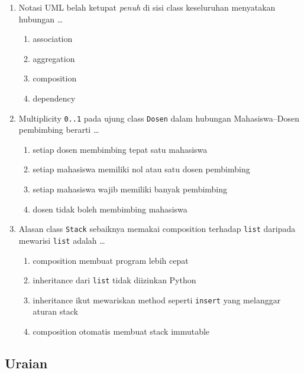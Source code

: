 \begin{enumerate}
  \item Notasi UML belah ketupat \emph{penuh} di sisi class keseluruhan menyatakan hubungan \ldots
  \begin{enumerate}[label=\alph*.,itemsep=0pt]
    \item association
    \item aggregation
    \item composition
    \item dependency
  \end{enumerate}

  \item Multiplicity \texttt{0..1} pada ujung class \texttt{Dosen} dalam hubungan Mahasiswa--Dosen pembimbing berarti \ldots
  \begin{enumerate}[label=\alph*.,itemsep=0pt]
    \item setiap dosen membimbing tepat satu mahasiswa
    \item setiap mahasiswa memiliki nol atau satu dosen pembimbing
    \item setiap mahasiswa wajib memiliki banyak pembimbing
    \item dosen tidak boleh membimbing mahasiswa
  \end{enumerate}

  \item Alasan class \texttt{Stack} sebaiknya memakai composition terhadap \texttt{list} daripada mewarisi \texttt{list} adalah \ldots
  \begin{enumerate}[label=\alph*.,itemsep=0pt]
    \item composition membuat program lebih cepat
    \item inheritance dari \texttt{list} tidak diizinkan Python
    \item inheritance ikut mewariskan method seperti \texttt{insert} yang melanggar aturan stack
    \item composition otomatis membuat stack immutable
  \end{enumerate}
\end{enumerate}

\subsection{Uraian}

